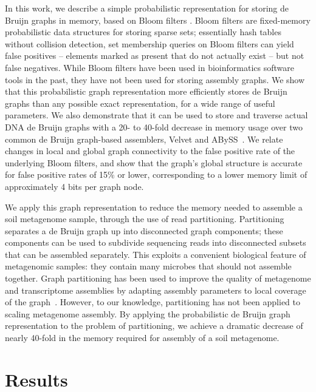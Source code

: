 \documentclass{pnastwo}
\begin{document}
\begin{article}
In this work, we describe a simple probabilistic representation for
storing de Bruijn graphs in memory, based on Bloom filters
\cite{bloom}.  Bloom filters are fixed-memory probabilistic data
structures for storing sparse sets; essentially hash tables without
collision detection, set membership queries on Bloom filters can yield
false positives -- elements marked as present that do not actually
exist -- but not false negatives. While Bloom filters have been used
in bioinformatics software tools in the past, they have not been used
for storing assembly
graphs\cite{bloomref1,bloomref2,bloomref3,bloomref4}. We show that
this probabilistic graph representation more efficiently stores de
Bruijn graphs than any possible exact representation, for a wide range
of useful parameters.  We also demonstrate that it can be used to
store and traverse actual DNA de Bruijn graphs with a 20- to 40-fold
decrease in memory usage over two common de Bruijn graph-based
assemblers, Velvet and ABySS~\cite{velvet,abyss}. We relate changes in
local and global graph connectivity to the false positive rate of the
underlying Bloom filters, and show that the graph's global structure
is accurate for false positive rates of 15\% or lower, corresponding
to a lower memory limit of approximately 4 bits per graph node.

We apply this graph representation to reduce the memory needed to
assemble a soil metagenome sample, through the use of read
partitioning.  Partitioning separates a de Bruijn graph up into
disconnected graph components; these components can be used to
subdivide sequencing reads into disconnected subsets that can be
assembled separately.  This exploits a convenient biological feature
of metagenomic samples: they contain many microbes that should not
assemble together.  Graph partitioning has been used to improve the
quality of metagenome and transcriptome assemblies by adapting
assembly parameters to local coverage of the
graph~\cite{metavelvet,pubmed21685107,trinity}.  However, to our
knowledge, partitioning has not been applied to scaling metagenome
assembly. By applying the probabilistic de Bruijn graph representation
to the problem of partitioning, we achieve a dramatic decrease of
nearly 40-fold in the memory required for assembly of a soil
metagenome.


\section{Results}


\end{article}
\end{document}
